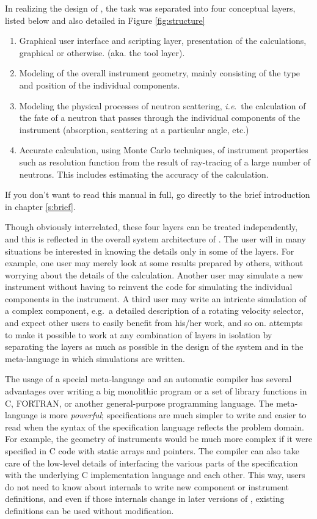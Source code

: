 In realizing the design of \MCS, the task was
separated into four conceptual layers, listed below and also detailed
in Figure \ref{fig:structure}
\begin{enumerate}
\item Graphical user interface and scripting layer, presentation of
  the calculations, graphical or otherwise. (aka. the tool layer).
\item Modeling of the overall instrument geometry, mainly consisting
  of the type and position of the individual components.
\item Modeling the physical processes of neutron scattering, \textit{i.e}.\
  the calculation of the fate of a neutron that passes through the
  individual components of the instrument (absorption, scattering at a
  particular angle, etc.)
\item Accurate calculation, using Monte Carlo techniques, of
  instrument properties such as resolution function from the result of
  ray-tracing of a large number of neutrons. This includes estimating
  the accuracy of the calculation.
\end{enumerate}

If you don't want to read this manual in full, go directly to the brief introduction in chapter \ref{s:brief}.

Though obviously interrelated, these four layers can be
treated independently, and this is reflected in the overall system
architecture of \MCS. The user will in many situations be
interested in knowing the details only in some of the layers. For
example, one user may merely look at some results prepared by others,
without worrying about the details of the calculation. Another user
may simulate a new instrument without having to reinvent the
code for simulating the individual components in the instrument. A third
user may write an intricate simulation of a complex component,
e.g.\ a detailed description of a rotating velocity selector,
and expect other users to easily
benefit from his/her work, and so on. \MCS attempts to make it
possible to work at any combination of layers in isolation by separating
the layers as much as possible in the design of the system and in
the meta-language in which simulations are written.

The usage of a special meta-language and an automatic compiler has
several advantages over writing a big monolithic program or a set of
library functions in C, FORTRAN, or another general-purpose programming
language.  The meta-language is more \textit{powerful}; specifications
are much simpler to write and easier to read when the syntax of the
specification language reflects the problem domain. For example, the
geometry of instruments would be much more complex if it were specified
in C code with static arrays and pointers. The compiler can also take
care of the low-level details of interfacing the various parts of the
specification with the underlying C implementation language and each
other. This way, users do not need to know about \MCS internals to
write new component or instrument definitions, and even if those
internals change in later versions of \MCS, existing definitions can be
used without modification.

